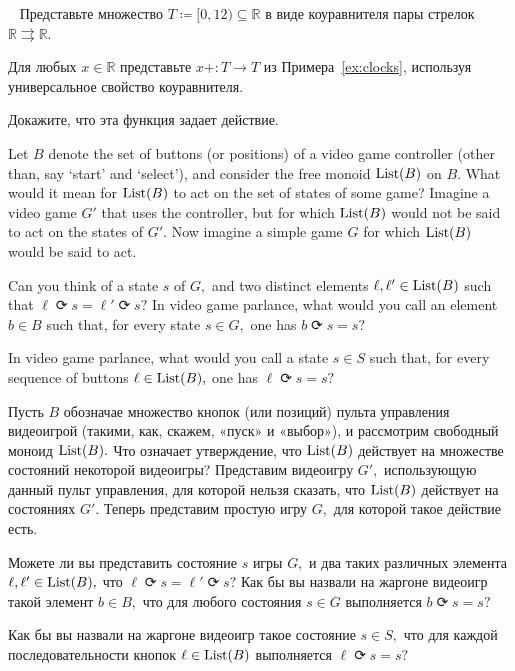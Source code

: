 \documentclass[../main/CT4S-EN-RU]{subfiles}
\begin{document}
\begin{exerciseRUS}\label{exc:clock}~
\sexc Представьте множество $T{\coloneqq}[0,12)\subseteq{ℝ}$ в виде коуравнителя пары стрелок ${ℝ}{⇉}{ℝ}.$
\item Для любых $x\in{ℝ}$ представьте $x+ \colon T{→} T$ из Примера~\ref{ex:clocks}, используя универсальное свойство коуравнителя.
\item Докажите, что эта функция задает действие.
\endsexc
\end{exerciseRUS}

\begin{exerciseENG}
Let $B$ denote the set of buttons (or positions) of a video game controller (other than, say `start' and `select'), and consider the free monoid $\operatorname{List}(B)$ on $B.$
\sexc What would it mean for $\operatorname{List}(B)$ to act on the set of states of some game? Imagine a video game $G'$ that uses the controller, but for which $\operatorname{List}(B)$ would not be said to act on the states of $G'.$ Now imagine a simple game $G$ for which $\operatorname{List}(B)$ would be said to act.
\item Can you think of a state $s$ of $G,$ and two distinct elements $\ell,\ell'\in\operatorname{List}(B)$ such that $\ell{⟳} s=\ell'{⟳} s?$ In video game parlance, what would you call an element $b\in B$ such that, for every state $s\in G,$ one has $b{⟳} s=s?$
\item In video game parlance, what would you call a state $s\in S$ such that, for every sequence of buttons $\ell\in\operatorname{List}(B),$ one has $\ell{⟳} s=s?$
\endsexc
\end{exerciseENG}

\begin{exerciseRUS}
Пусть $B$ обозначае множество кнопок (или позиций) пульта управления видеоигрой (такими, как, скажем, «пуск» и «выбор»), и рассмотрим свободный моноид $\operatorname{List}(B).$
\sexc Что означает утверждение, что $\operatorname{List}(B)$ действует на множестве состояний некоторой видеоигры? Представим видеоигру $G',$ использующую данный пульт управления, для которой нельзя сказать, что  $\operatorname{List}(B)$ действует на состояниях $G'.$ Теперь представим простую игру $G,$ для которой такое действие есть.
\item Можете ли вы представить состояние $s$ игры $G,$ и два таких различных элемента $\ell,\ell'\in\operatorname{List}(B),$ что $\ell{⟳} s=\ell'{⟳} s?$ Как бы вы назвали на жаргоне видеоигр такой элемент $b\in B,$ что для любого состояния $s\in G$ выполняется $b{⟳} s=s?$
\item Как бы вы назвали на жаргоне видеоигр такое состояние $s\in S,$ что для каждой последовательности кнопок $\ell\in\operatorname{List}(B)$ выполняется $\ell{⟳} s=s?$
\endsexc
\end{exerciseRUS}
\end{document}
